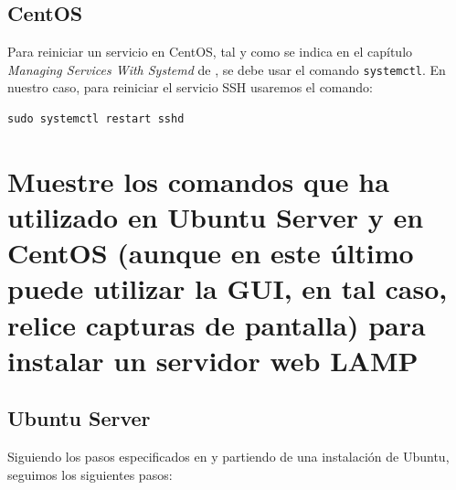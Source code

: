 \documentclass[10pt,a4paper,spanish]{article}
\numberwithin{equation}{section} %
\numberwithin{figure}{section} %
\numberwithin{table}{section} %
\begin{document}
\subsection{CentOS}
Para reiniciar un servicio en CentOS, tal y como se indica en el capítulo \textit{Managing Services With Systemd} de \cite{redhatctl}, se debe usar el comando \texttt{systemctl}. En nuestro caso, para reiniciar el servicio SSH usaremos el comando:
\begin{verbatim}
sudo systemctl restart sshd
\end{verbatim}

\section{Muestre los comandos que ha utilizado en Ubuntu Server y en CentOS (aunque en este último puede utilizar la GUI, en tal caso, relice capturas de pantalla) para instalar un servidor web LAMP}
\subsection{Ubuntu Server}
Siguiendo los pasos especificados en \cite{digocean} y partiendo de una instalación de Ubuntu, seguimos los siguientes pasos:
\end{document}
